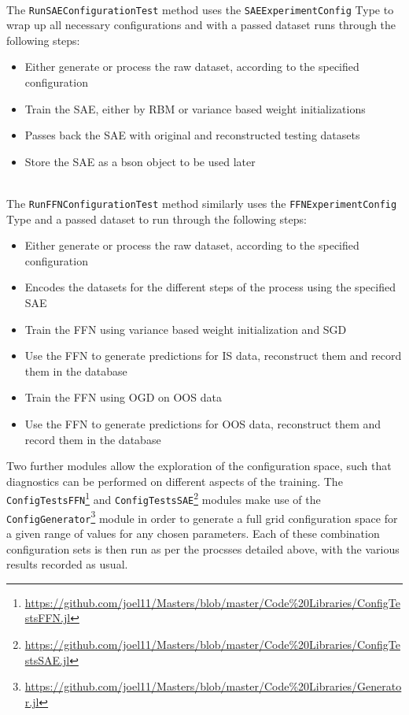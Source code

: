 \documentclass[a4paper,11pt,oneside]{article}
\theoremstyle{plain}
\theoremstyle{definition}
\begin{document}
~\\
The \texttt{RunSAEConfigurationTest} method uses the \texttt{SAEExperimentConfig} Type to wrap up all necessary configurations and with a passed dataset runs through the following steps:
\begin{itemize}
	\item[1] Either generate or process the raw dataset, according to the specified configuration
	\item[2] Train the SAE, either by RBM or variance based weight initializations
	\item[3] Passes back the SAE with original and reconstructed testing datasets
	\item[4] Store the SAE as a bson object to be used later
\end{itemize}

~\\
The \texttt{RunFFNConfigurationTest} method similarly uses the \texttt{FFNExperimentConfig} Type and a passed dataset to run through the following steps:
\begin{itemize}
	\item[1] Either generate or process the raw dataset, according to the specified configuration
	\item[2] Encodes the datasets for the different steps of the process using the specified SAE
	\item[3] Train the FFN using variance based weight initialization and SGD
	\item[4] Use the FFN to generate predictions for IS data, reconstruct them and record them in the database
	\item[5] Train the FFN using OGD on OOS data
	\item[6] Use the FFN to generate predictions for OOS data, reconstruct them and record them in the database
\end{itemize}

Two further modules allow the exploration of the configuration space, such that diagnostics can be performed on different aspects of the training. 	The \texttt{ConfigTestsFFN}\footnote{\url{https://github.com/joel11/Masters/blob/master/Code\%20Libraries/ConfigTestsFFN.jl}} and \texttt{ConfigTestsSAE}\footnote{\url{https://github.com/joel11/Masters/blob/master/Code\%20Libraries/ConfigTestsSAE.jl}} modules make use of the \texttt{ConfigGenerator}\footnote{\url{https://github.com/joel11/Masters/blob/master/Code\%20Libraries/Generator.jl}} module in order to generate a full grid configuration space for a given range of values for any chosen parameters. Each of these combination configuration sets is then run as per the procsses detailed above, with the various results recorded as usual. 
\end{document}
